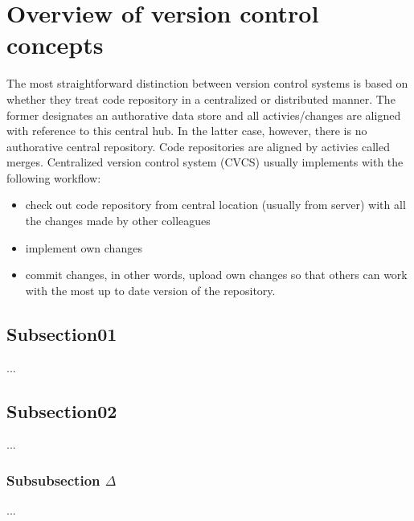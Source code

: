 \section{Overview of version control concepts}
The most straightforward distinction between version control systems is based on whether they treat code repository in 
a centralized or distributed manner. The former designates an authorative data store and all activies/changes are 
aligned with reference to this central hub. In the latter case, however, there is no authorative central repository.
Code repositories are aligned by activies called merges.  
Centralized version control system (CVCS) usually implements with the following workflow:
\begin{itemize}
    \item check out code repository from central location (usually from server) with all the changes made by other
    colleagues
    \item implement own changes
    \item commit changes, in other words, upload own changes so that others can work with the most up to date version of
    the repository.
\end{itemize}
    \subsection{Subsection01}
    ...

    \subsection{Subsection02}
    ...

    \subsubsection{Subsubsection $\Delta$}
    ...
